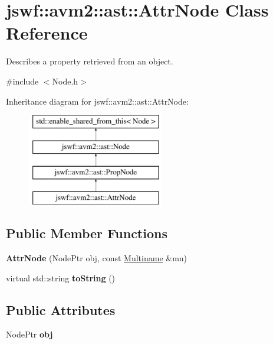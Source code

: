 \hypertarget{classjswf_1_1avm2_1_1ast_1_1_attr_node}{\section{jswf\+:\+:avm2\+:\+:ast\+:\+:Attr\+Node Class Reference}
\label{classjswf_1_1avm2_1_1ast_1_1_attr_node}
}


Describes a property retrieved from an object.  




{\ttfamily \#include $<$Node.\+h$>$}

Inheritance diagram for jswf\+:\+:avm2\+:\+:ast\+:\+:Attr\+Node\+:\begin{figure}[H]
\begin{center}
\leavevmode
\includegraphics[height=4.000000cm]{classjswf_1_1avm2_1_1ast_1_1_attr_node}
\end{center}
\end{figure}
\subsection*{Public Member Functions}
\begin{DoxyCompactItemize}
\item 
\hypertarget{classjswf_1_1avm2_1_1ast_1_1_attr_node_ae80534f276b907a5152fda014a700046}{{\bfseries Attr\+Node} (Node\+Ptr obj, const \hyperlink{structjswf_1_1avm2_1_1_multiname}{Multiname} \&mn)}\label{classjswf_1_1avm2_1_1ast_1_1_attr_node_ae80534f276b907a5152fda014a700046}

\item 
\hypertarget{classjswf_1_1avm2_1_1ast_1_1_attr_node_a4ea079134d2ba0203e0bcc9504867cf3}{virtual std\+::string {\bfseries to\+String} ()}\label{classjswf_1_1avm2_1_1ast_1_1_attr_node_a4ea079134d2ba0203e0bcc9504867cf3}

\end{DoxyCompactItemize}
\subsection*{Public Attributes}
\begin{DoxyCompactItemize}
\item 
\hypertarget{classjswf_1_1avm2_1_1ast_1_1_attr_node_a1ba2f869002fc01715d80c5364026f9f}{Node\+Ptr {\bfseries obj}}\label{classjswf_1_1avm2_1_1ast_1_1_attr_node_a1ba2f869002fc01715d80c5364026f9f}

\end{DoxyCompactItemize}


